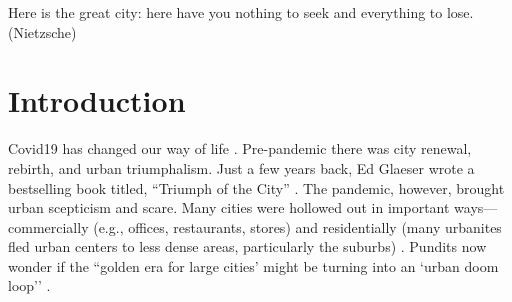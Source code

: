 \documentclass[10pt, letterpaper]{article}
\begin{document}
\begin{spacing}{1.4}

\noindent Here is the great city: here have you nothing to seek and everything to lose. (Nietzsche)\\

\section{Introduction} 


Covid19 has changed our way of life \citep{olasov22}. %
 Pre-pandemic there was city renewal, rebirth, and urban triumphalism. Just a
 few years back, Ed Glaeser wrote a bestselling book titled, ``Triumph of the City''
 \citep{peck16}. The pandemic, however, brought urban scepticism and scare. Many cities were hollowed out in important ways---commercially (e.g., offices, restaurants, stores) and residentially (many urbanites fled urban centers to less dense areas, particularly the suburbs) \citep{nixey20apr29}. Pundits now wonder if the ``golden era for large cities' might be turning into an `urban doom loop'' \citep{edsall2022,robbins2021}. 

%


\end{spacing}
\end{document}
